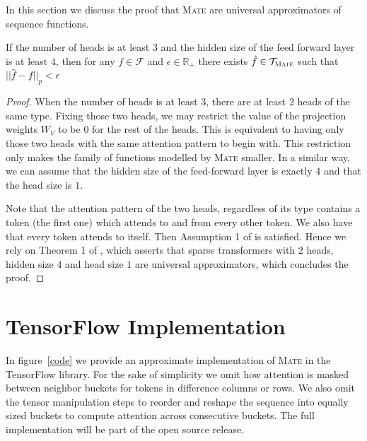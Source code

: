 \documentclass[11pt]{article}
\newcommand{\model}{\textsc{Mate}\xspace}
\begin{document}
In this section we discuss the proof that \model are universal approximators of sequence functions.

\begin{theorem*}
If the number of heads is at least $3$ and the hidden size of the feed forward layer is at least $4$, then for any $f\in \mathcal{F}$ and 
$\epsilon \in \mathbb{R}_+$ 
there exists $\hat{f}\in\mathcal{T}_\model$ such that $||\hat{f} - {f}||_p < \epsilon$
\end{theorem*}

\begin{proof}
When the number of heads is at least $3$, there are at least $2$ heads of the same type. Fixing those two heads, we may restrict the value of the projection weights $W_V$ to be $0$ for the rest of the heads. This is equivalent to having only those two heads with the same attention pattern to begin with.
This restriction only makes the family of functions modelled by \model smaller. In a similar way, we can assume that the hidden size of the feed-forward layer is exactly $4$ and that the head size is $1$.

Note that the attention pattern of the two heads, regardless of its type contains a token (the first one) which attends to and from every other token. We also have that every token attends to itself. Then Assumption 1 of \citet{univapprox2020} is satisfied. 
Hence we rely on Theorem 1 of \citet{univapprox2020}, which asserts that sparse transformers with $2$ heads, hidden size $4$ and head size $1$ are universal approximators, which concludes the proof.
\end{proof}

\section{TensorFlow Implementation}
\label{sec:apx-code}

In figure~\ref{code} we provide an approximate implementation of \model in the TensorFlow library. For the sake of simplicity we omit how attention is masked between neighbor buckets for tokens in difference columns or rows. We also omit the tensor manipulation steps to reorder and reshape the sequence into equally sized buckets to compute attention across consecutive buckets. The full implementation will be part of the open source release.

\end{document}
